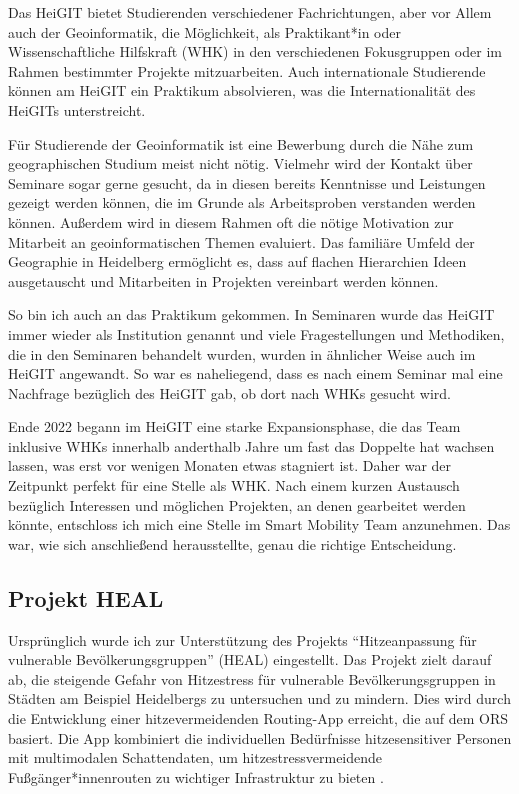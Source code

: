 \documentclass[11pt]{article}
\begin{document}
Das HeiGIT bietet Studierenden verschiedener Fachrichtungen, aber vor Allem auch der Geoinformatik, die Möglichkeit, als Praktikant*in oder Wissenschaftliche Hilfskraft (WHK) in den verschiedenen Fokusgruppen oder im Rahmen bestimmter Projekte mitzuarbeiten. Auch internationale Studierende können am HeiGIT ein Praktikum absolvieren, was die Internationalität des HeiGITs unterstreicht.

Für Studierende der Geoinformatik ist eine Bewerbung durch die Nähe zum geographischen Studium meist nicht nötig. Vielmehr wird der Kontakt über Seminare sogar gerne gesucht, da in diesen bereits Kenntnisse und Leistungen gezeigt werden können, die im Grunde als Arbeitsproben verstanden werden können. Außerdem wird in diesem Rahmen oft die nötige Motivation zur Mitarbeit an geoinformatischen Themen evaluiert. Das familiäre Umfeld der Geographie in Heidelberg ermöglicht es, dass auf flachen Hierarchien Ideen ausgetauscht und Mitarbeiten in Projekten vereinbart werden können.

So bin ich auch an das Praktikum gekommen. In Seminaren wurde das HeiGIT immer wieder als Institution genannt und viele Fragestellungen und Methodiken, die in den Seminaren behandelt wurden, wurden in ähnlicher Weise auch im HeiGIT angewandt. So war es naheliegend, dass es nach einem Seminar mal eine Nachfrage bezüglich des HeiGIT gab, ob dort nach WHKs gesucht wird.

Ende 2022 begann im HeiGIT eine starke Expansionsphase, die das Team inklusive WHKs innerhalb anderthalb Jahre um fast das Doppelte hat wachsen lassen, was erst vor wenigen Monaten etwas stagniert ist. Daher war der Zeitpunkt perfekt für eine Stelle als WHK. Nach einem kurzen Austausch bezüglich Interessen und möglichen Projekten, an denen gearbeitet werden könnte, entschloss ich mich eine Stelle im Smart Mobility Team anzunehmen. Das war, wie sich anschließend herausstellte, genau die richtige Entscheidung. 

\subsection{Projekt HEAL}

Ursprünglich wurde ich zur Unterstützung des Projekts \enquote{Hitzeanpassung für vulnerable Bevölkerungsgruppen} (HEAL) \autocite{HEAL2024} eingestellt. Das Projekt zielt darauf ab, die steigende Gefahr von Hitzestress für vulnerable Bevölkerungsgruppen in Städten am Beispiel Heidelbergs zu untersuchen und zu mindern. Dies wird durch die Entwicklung einer hitzevermeidenden Routing-App erreicht, die auf dem ORS basiert. Die App kombiniert die individuellen Bedürfnisse hitzesensitiver Personen mit multimodalen Schattendaten, um hitzestressvermeidende Fußgänger*innenrouten zu wichtiger Infrastruktur zu bieten \autocite{Foshag.Furle.ea2024}.
\end{document}
